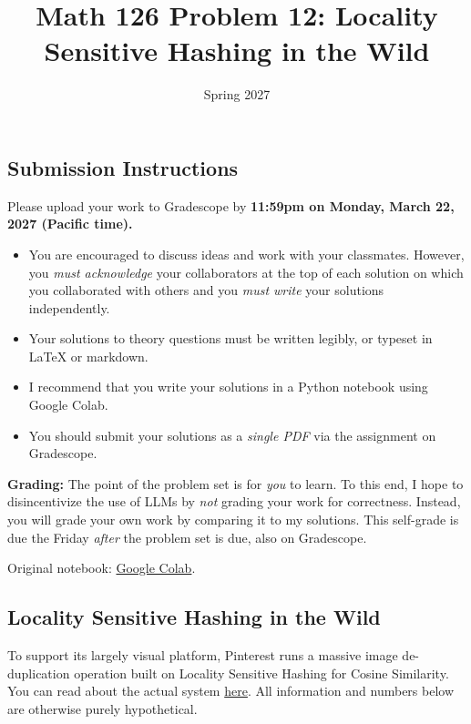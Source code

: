 \documentclass{article}
\title{Math 126 Problem 12: Locality Sensitive Hashing in the Wild}
\author{} %
\date{Spring 2027}
\begin{document}
\maketitle

\hypertarget{submission-instructions}{%
\subsection*{Submission Instructions}\label{submission-instructions}}

Please upload your work to Gradescope by \textbf{11:59pm on Monday, March 22, 2027 (Pacific time).}

\begin{itemize}
\item
  You are encouraged to discuss ideas and work with your classmates. However, you \emph{must acknowledge} your collaborators at the top of each solution on which you collaborated with others and you \emph{must write} your solutions independently.
\item
  Your solutions to theory questions must be written legibly, or typeset in LaTeX or markdown.
\item
  I recommend that you write your solutions in a Python notebook using Google Colab.
\item
  You should submit your solutions as a \emph{single PDF} via the assignment on Gradescope.
\end{itemize}

\textbf{Grading:} The point of the problem set is for \emph{you} to learn. To this end, I hope to disincentivize the use of LLMs by \emph{not} grading your work for correctness. Instead, you will grade your own work by comparing it to my solutions. This self-grade is due the Friday \emph{after} the problem set is due, also on Gradescope.

\noindent Original notebook: \href{https://colab.research.google.com/drive/1h893kni7lVBI9OqHD7sY420JWlzHawQy?usp=sharing}{Google Colab}.

\hypertarget{locality-sensitive-hashing-in-the-wild}{%
\subsection*{Locality Sensitive Hashing in the Wild}\label{locality-sensitive-hashing-in-the-wild}}

To support its largely visual platform, Pinterest runs a massive image de-duplication operation built on Locality Sensitive Hashing for Cosine Similarity. You can read about the actual system \href{https://medium.com/pinterest-engineering/detecting-image-similarity-using-spark-lsh-and-tensorflow-618636afc939}{here}. All information and numbers below are otherwise purely hypothetical.
\end{document}
